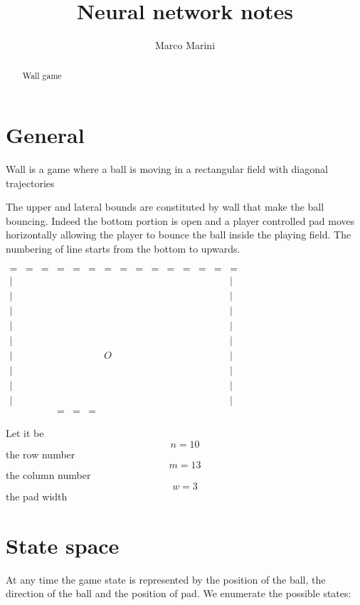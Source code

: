 \documentclass[a4paper,11pt]{article}
\title{Neural network notes}
\author{Marco Marini}
\begin{document}
\maketitle
\tableofcontents

\begin{abstract}
Wall game
\end{abstract}

\section{General}

Wall is a game where a ball is moving in a rectangular field with diagonal trajectories

The upper and lateral bounds are constituted by wall that make the ball bouncing.
Indeed the bottom portion is open and a player controlled pad moves horizontally
allowing the player to bounce the ball inside the playing field.
The numbering of line starts from the bottom to upwards.

$
\begin{array}{ccccccccccccccc}
=	& = & = & = & = & = & = & = & = & = & = & = & = & = & = \\
|	&  &  &  &  &  &  &  &  &  &  &  &  &  & | \\ 
|	&  &  &  &  &  &  &  &  &  &  &  &  &  & | \\ 
|	&  &  &  &  &  &  &  &  &  &  &  &  &  & | \\ 
|	&  &  &  &  &  &  &  &  &  &  &  &  &  & | \\ 
|	&  &  &  &  &  &  &  &  &  &  &  &  &  & | \\ 
|	&  &  &  &  &  & O &  &  &  &  &  &  &  & | \\ 
|	&  &  &  &  &  &  &  &  &  &  &  &  &  & | \\ 
|	&  &  &  &  &  &  &  &  &  &  &  &  &  & | \\ 
|	&  &  &  &  &  &  &  &  &  &  &  &  &  & | \\ 
	&  &  & = & = & = &  &  &  &  &  &  &  &  & 
\end{array} 
$

Let it be
\[ n = 10 \] the row number
\[ m = 13 \] the column number
\[ w = 3 \] the pad width


\section{State space}

At any time the game state is represented by the position
of the ball, the direction of the ball and the position of pad.
We enumerate the possible states:
\end{document}
